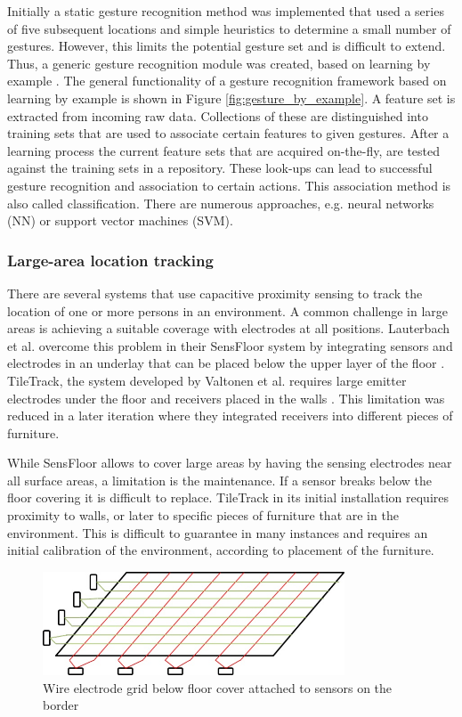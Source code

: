Initially a static gesture recognition method was implemented that used a series of five subsequent locations and simple heuristics to determine a small number of gestures. However, this limits the potential gesture set and is difficult to extend. Thus, a generic gesture recognition module was created, based on learning by example \cite{braun2013capacitive}. The general functionality of a gesture recognition framework based on learning by example is shown in Figure \ref{fig:gesture_by_example}. A feature set is extracted from incoming raw data. Collections of these are distinguished into training sets that are used to associate certain features to given gestures. After a learning process the current feature sets that are acquired on-the-fly, are tested against the training sets in a repository. These look-ups can lead to successful gesture recognition and association to certain actions. This association method is also called classification. There are numerous approaches, e.g. neural networks (NN) or support vector machines (SVM).

\subsubsection{Large-area location tracking}
There are several systems that use capacitive proximity sensing to track the location of one or more persons in an environment. A common challenge in large areas is achieving a suitable coverage with electrodes at all positions. Lauterbach et al. overcome this problem in their SensFloor system by integrating sensors and electrodes in an underlay that can be placed below the upper layer of the floor \cite{lauterbach2009}. TileTrack, the system developed by Valtonen et al. requires large emitter electrodes under the floor and receivers placed in the walls \cite{Valtonen2009a}. This limitation was reduced in a later iteration where they integrated receivers into different pieces of furniture.

While SensFloor allows to cover large areas by having the sensing electrodes near all surface areas, a limitation is the maintenance. If a sensor breaks below the floor covering it is difficult to replace. TileTrack in its initial installation requires proximity to walls, or later to specific pieces of furniture that are in the environment. This is difficult to guarantee in many instances and requires an initial calibration of the environment, according to placement of the furniture.

\begin{figure}[h]
\centering
\includegraphics[width=0.8\textwidth]{images/capfloor_concept}
\caption{Wire electrode grid below floor cover attached to sensors on the border}
\label{fig:capfloor_concept}
\end{figure}

